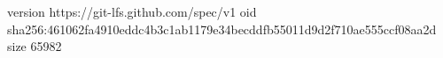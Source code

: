 version https://git-lfs.github.com/spec/v1
oid sha256:461062fa4910eddc4b3c1ab1179e34becddfb55011d9d2f710ae555ccf08aa2d
size 65982
